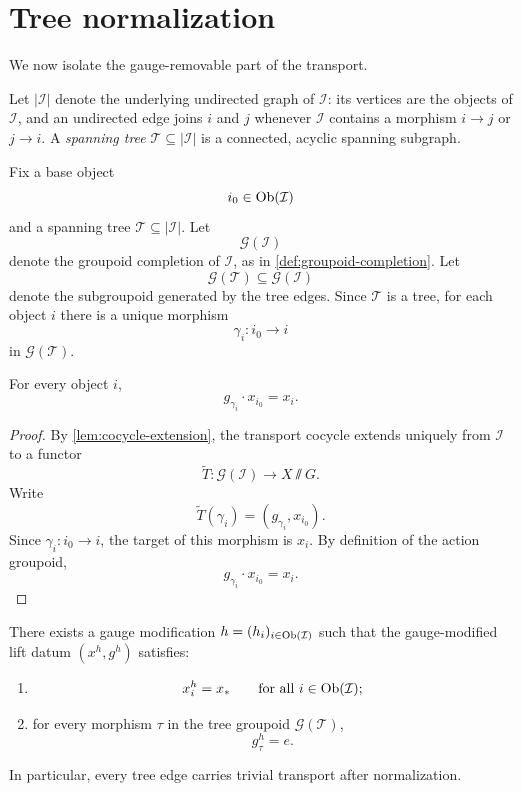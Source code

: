 \section{Tree normalization}
We now isolate the gauge-removable part of the transport.
\begin{definition}
	Let \(|\mathcal I|\) denote the underlying undirected graph of
	\(\mathcal I\): its vertices are the objects of \(\mathcal I\), and an
	undirected edge joins \(i\) and \(j\) whenever \(\mathcal I\) contains a
	morphism \(i\to j\) or \(j\to i\).
	A \emph{spanning tree} \(\mathcal T\subseteq |\mathcal I|\) is a
	connected, acyclic spanning subgraph.
\end{definition}
Fix a base object
\[
	i_0\in \operatorname{Ob}(\mathcal I)
\]
and a spanning tree \(\mathcal T\subseteq |\mathcal I|\).
Let
\[
	\mathcal G(\mathcal I)
\]
denote the groupoid completion of \(\mathcal I\), as in
\cref{def:groupoid-completion}. Let
\[
	\mathcal G(\mathcal T)\subseteq \mathcal G(\mathcal I)
\]
denote the subgroupoid generated by the tree edges. Since \(\mathcal T\)
is a tree, for each object \(i\) there is a unique morphism
\[
	\gamma_i:i_0\to i
\]
in \(\mathcal G(\mathcal T)\).
\begin{lemma}
	\label{lem:DO-tree-path}
	For every object \(i\),
	\[
		g_{\gamma_i}\cdot x_{i_0}=x_i.
	\]
\end{lemma}
\begin{proof}
	By \cref{lem:cocycle-extension}, the transport cocycle extends uniquely
	from \(\mathcal I\) to a functor
	\[
		\widetilde T:\mathcal G(\mathcal I)\to X\sslash G.
	\]
	Write
	\[
		\widetilde T(\gamma_i)=(g_{\gamma_i},x_{i_0}).
	\]
	Since \(\gamma_i:i_0\to i\), the target of this morphism is \(x_i\).
	By definition of the action groupoid,
	\[
		g_{\gamma_i}\cdot x_{i_0}=x_i.
	\]
\end{proof}
\begin{theorem}
	\label{thm:DO-tree-normalize}
	There exists a gauge modification \(h=(h_i)_{i\in\operatorname{Ob}(\mathcal I)}\)
	such that the gauge-modified lift datum \((x^h,g^h)\) satisfies:
	\begin{enumerate}
		\item
		      \[
			      x_i^h=x_*
			      \qquad
			      \text{for all }i\in\operatorname{Ob}(\mathcal I);
		      \]
		\item for every morphism \(\tau\) in the tree groupoid
		      \(\mathcal G(\mathcal T)\),
		      \[
			      g_\tau^h=e.
		      \]
	\end{enumerate}
	In particular, every tree edge carries trivial transport after
	normalization.
\end{theorem}
